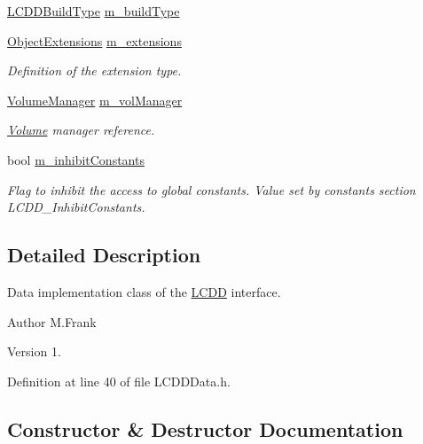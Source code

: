 \begin{DoxyCompactItemize}
\item 
\hyperlink{namespace_d_d4hep_acafe43ba4537ab6e999e808142965fab}{L\+C\+D\+D\+Build\+Type} \hyperlink{class_d_d4hep_1_1_geometry_1_1_l_c_d_d_data_aac00f4e1c495c5fb7a80037be3acb19e}{m\+\_\+build\+Type}
\item 
\hyperlink{class_d_d4hep_1_1_object_extensions}{Object\+Extensions} \hyperlink{class_d_d4hep_1_1_geometry_1_1_l_c_d_d_data_a686aca104b9460a62e5a89d8abbd3b7c}{m\+\_\+extensions}
\begin{DoxyCompactList}\small\item\em Definition of the extension type. \end{DoxyCompactList}\item 
\hyperlink{class_d_d4hep_1_1_geometry_1_1_volume_manager}{Volume\+Manager} \hyperlink{class_d_d4hep_1_1_geometry_1_1_l_c_d_d_data_a8a01d0ac487c537e9826d2900c95062a}{m\+\_\+vol\+Manager}
\begin{DoxyCompactList}\small\item\em \hyperlink{class_d_d4hep_1_1_geometry_1_1_volume}{Volume} manager reference. \end{DoxyCompactList}\item 
bool \hyperlink{class_d_d4hep_1_1_geometry_1_1_l_c_d_d_data_a81f222787e773b64fd9c8898f5e0aa9b}{m\+\_\+inhibit\+Constants}
\begin{DoxyCompactList}\small\item\em Flag to inhibit the access to global constants. Value set by constants section \textquotesingle{}L\+C\+D\+D\+\_\+\+Inhibit\+Constants\textquotesingle{}. \end{DoxyCompactList}\end{DoxyCompactItemize}


\subsection{Detailed Description}
Data implementation class of the \hyperlink{class_d_d4hep_1_1_geometry_1_1_l_c_d_d}{L\+C\+DD} interface. 

\begin{DoxyAuthor}{Author}
M.\+Frank 
\end{DoxyAuthor}
\begin{DoxyVersion}{Version}
1. 
\end{DoxyVersion}


Definition at line 40 of file L\+C\+D\+D\+Data.\+h.



\subsection{Constructor \& Destructor Documentation}
\hypertarget{class_d_d4hep_1_1_geometry_1_1_l_c_d_d_data_a708e690646050f36f621ac61052b07cd}{}\label{class_d_d4hep_1_1_geometry_1_1_l_c_d_d_data_a708e690646050f36f621ac61052b07cd} 
